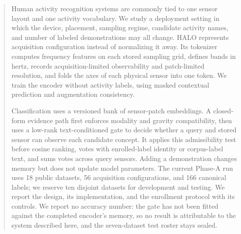 \documentclass[sigconf, 10pt]{acmart}
\begin{document}
\begin{abstract}
Human activity recognition systems are commonly tied to one sensor layout and one activity
vocabulary. We study a deployment setting in which the device, placement, sampling regime,
candidate activity names, and number of labeled demonstrations may all change. HALO represents
acquisition configuration instead of normalizing it away. Its tokenizer computes frequency
features on each stored sampling grid, defines bands in hertz, records acquisition-limited
observability and patch-limited resolution, and folds the axes of each physical sensor into one
token. We train the encoder without activity labels, using masked contextual prediction and
augmentation consistency.

Classification uses a versioned bank of sensor-patch embeddings. A closed-form evidence path first
enforces modality and gravity compatibility, then uses a low-rank text-conditioned gate to decide
whether a query and stored sensor can observe each candidate concept. It applies this admissibility
test before cosine ranking, votes with enrolled-label identity or corpus-label text, and sums votes
across query sensors. Adding a demonstration changes memory but does not update model parameters.
The current Phase-A run uses 18 public datasets, 56 acquisition configurations, and 166 canonical
labels; we reserve ten disjoint datasets for development and testing. We report the design, its
implementation, and the enrollment protocol with its controls. We report no accuracy number: the
gate has not been fitted against the completed encoder's memory, so no result is attributable to
the system described here, and the seven-dataset test roster stays sealed.
\end{abstract}


\maketitle














\end{document}
